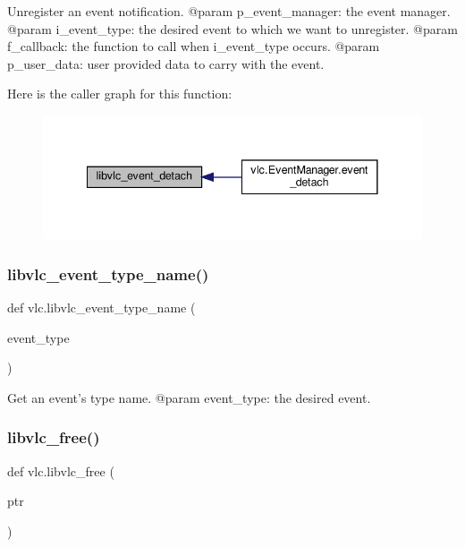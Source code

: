 \begin{DoxyVerb}Unregister an event notification.
@param p_event_manager: the event manager.
@param i_event_type: the desired event to which we want to unregister.
@param f_callback: the function to call when i_event_type occurs.
@param p_user_data: user provided data to carry with the event.
\end{DoxyVerb}
 Here is the caller graph for this function\+:
\nopagebreak
\begin{figure}[H]
\begin{center}
\leavevmode
\includegraphics[width=341pt]{namespacevlc_a67ba99f7479ae36483024ec3e8746380_icgraph}
\end{center}
\end{figure}
\mbox{\label{namespacevlc_aaec28b9045ae171b47c2212bcd8058fa}} 
\subsubsection{\texorpdfstring{libvlc\+\_\+event\+\_\+type\+\_\+name()}{libvlc\_event\_type\_name()}}
{\footnotesize\ttfamily def vlc.\+libvlc\+\_\+event\+\_\+type\+\_\+name (\begin{DoxyParamCaption}\item[{}]{event\+\_\+type }\end{DoxyParamCaption})}

\begin{DoxyVerb}Get an event's type name.
@param event_type: the desired event.
\end{DoxyVerb}
 \mbox{\label{namespacevlc_a517c22313b52ae70f97af003f7ef7d5a}} 
\subsubsection{\texorpdfstring{libvlc\+\_\+free()}{libvlc\_free()}}
{\footnotesize\ttfamily def vlc.\+libvlc\+\_\+free (\begin{DoxyParamCaption}\item[{}]{ptr }\end{DoxyParamCaption})}

